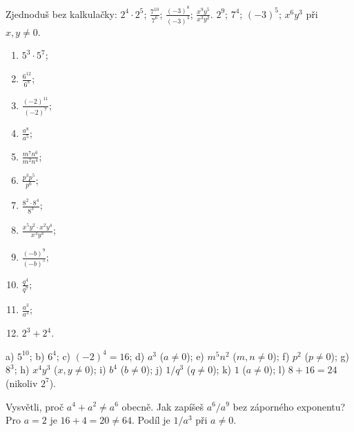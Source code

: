 \documentclass[11pt,a4paper]{article}
\begin{document}
\begin{prikladReseniBox}[title={Příklad 1},breakable=false]
Zjednoduš bez kalkulačky:
$2^4\cdot2^5$; $\frac{7^{10}}{7^6}$; $\frac{(-3)^8}{(-3)^3}$;
$\frac{x^9y^5}{x^3y^2}$.
\tcblower
$2^9$; $7^4$; $(-3)^5$; $x^6y^3$ při $x,y\ne0$.
\end{prikladReseniBox}
\begin{zadaniReseniBox}[title={Samostatná práce 1}]
\begin{enumerate}[label=\alph*)]
\item $5^3\cdot5^7$; \item $\frac{6^{12}}{6^8}$;
\item $\frac{(-2)^{11}}{(-2)^7}$; \item $\frac{a^8}{a^5}$;
\item $\frac{m^7n^6}{m^2n^4}$; \item $\frac{p^3p^5}{p^6}$;
\item $\frac{8^2\cdot8^4}{8^3}$; \item $\frac{x^5y^2\cdot x^2y^4}{x^3y^3}$;
\item $\frac{(-b)^9}{(-b)^5}$; \item $\frac{q^4}{q^7}$;
\item $\frac{a^3}{a^3}$; \item $2^3+2^4$.
\end{enumerate}
\tcblower
 a) $5^{10}$; b) $6^4$; c) $(-2)^4=16$; d) $a^3$ ($a\ne0$);
 e) $m^5n^2$ ($m,n\ne0$); f) $p^2$ ($p\ne0$);
 g) $8^3$; h) $x^4y^3$ ($x,y\ne0$); i) $b^4$ ($b\ne0$);
 j) $1/q^3$ ($q\ne0$); k) $1$ ($a\ne0$);
 l) $8+16=24$ (nikoliv $2^7$).
\end{zadaniReseniBox}
\begin{zadaniReseniBox}[title={Rozšíření 1},breakable=false]
Vysvětli, proč $a^4+a^2\ne a^6$ obecně.
Jak zapíšeš $a^6/a^9$ bez záporného exponentu?
\tcblower
Pro $a=2$ je $16+4=20\ne64$. Podíl je $1/a^3$ při $a\ne0$.
\end{zadaniReseniBox}
\end{document}
